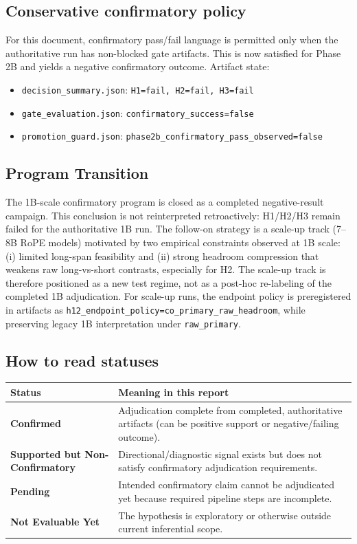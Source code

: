 \documentclass[11pt]{article}
\newcommand{\statusConfirmed}{\textbf{Confirmed}}
\newcommand{\statusSupported}{\textbf{Supported but Non-Confirmatory}}
\newcommand{\statusPending}{\textbf{Pending}}
\newcommand{\statusNotEval}{\textbf{Not Evaluable Yet}}
\begin{document}
\subsection*{Conservative confirmatory policy}
For this document, confirmatory pass/fail language is permitted only when the authoritative run has non-blocked gate artifacts. This is now satisfied for Phase 2B and yields a negative confirmatory outcome. Artifact state:
\begin{itemize}[leftmargin=*]
  \item \texttt{decision\_summary.json}: \texttt{H1=fail, H2=fail, H3=fail}
  \item \texttt{gate\_evaluation.json}: \texttt{confirmatory\_success=false}
  \item \texttt{promotion\_guard.json}: \texttt{phase2b\_confirmatory\_pass\_observed=false}
\end{itemize}

\subsection*{Program Transition}
The 1B-scale confirmatory program is closed as a completed negative-result campaign. This conclusion is not reinterpreted retroactively: H1/H2/H3 remain failed for the authoritative 1B run. The follow-on strategy is a scale-up track (7--8B RoPE models) motivated by two empirical constraints observed at 1B scale: (i) limited long-span feasibility and (ii) strong headroom compression that weakens raw long-vs-short contrasts, especially for H2. The scale-up track is therefore positioned as a new test regime, not as a post-hoc re-labeling of the completed 1B adjudication. For scale-up runs, the endpoint policy is preregistered in artifacts as \texttt{h12\_endpoint\_policy=co\_primary\_raw\_headroom}, while preserving legacy 1B interpretation under \texttt{raw\_primary}.

\subsection*{How to read statuses}
\begin{table}[h]
\centering
\begin{tabularx}{\textwidth}{L{0.24\textwidth}Y}
\toprule
\textbf{Status} & \textbf{Meaning in this report} \\
\midrule
\statusConfirmed & Adjudication complete from completed, authoritative artifacts (can be positive support or negative/failing outcome). \\
\statusSupported & Directional/diagnostic signal exists but does not satisfy confirmatory adjudication requirements. \\
\statusPending & Intended confirmatory claim cannot be adjudicated yet because required pipeline steps are incomplete. \\
\statusNotEval & The hypothesis is exploratory or otherwise outside current inferential scope. \\
\bottomrule
\end{tabularx}
\end{table}
\end{document}
